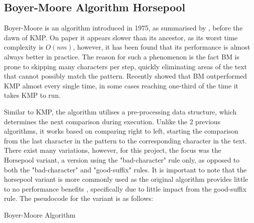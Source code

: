 \subsection{Boyer-Moore Algorithm Horsepool}

Boyer-Moore is an algorithm introduced in 1975, as summarised by \cite{bm}, before the dawn of KMP. On paper it appears slower than its ancestor, as its worst time complexity is $O(nm)$, however, it has been found that its performance is almost always better in practice. The reason for such a phenomenon is the fact BM is prone to skipping many characters per step, quickly eliminating areas of the text that cannot possibly match the pattern. Recently \cite{KMPvsBM} showed that BM outperformed KMP almost every single time, in some cases reaching one-third of the time it takes KMP to run.

Similar to KMP, the algorithm utilises a pre-processing data structure, which determines the next comparison during execution. Unlike the 2 previous algorithms, it works based on comparing right to left, starting the comparison from the last character in the pattern to the corresponding character in the text. There exist many variations, however, for this project, the focus was the Horsepool variant, a version using the "bad-character" rule only, as opposed to both the "bad-character" and "good-suffix" rules. It is important to note that the horsepool variant is more commonly used as the original algorithm provides little to no performance benefits \cite{horsepool_vs_full}, specifically due to little impact from the good-suffix rule. The pseudocode for the variant is as follows:


\begin{algorithm}[H]
    \DontPrintSemicolon

\caption{Boyer-Moore Algorithm}
\label{alg:boyer_moore}
\end{algorithm}


